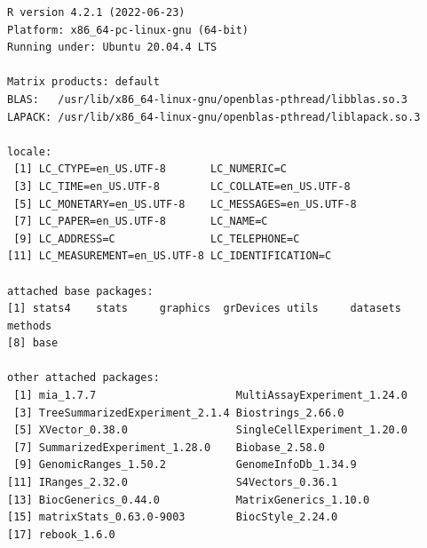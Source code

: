 \documentclass[
]{book}
\begin{document}
\begin{verbatim}
R version 4.2.1 (2022-06-23)
Platform: x86_64-pc-linux-gnu (64-bit)
Running under: Ubuntu 20.04.4 LTS

Matrix products: default
BLAS:   /usr/lib/x86_64-linux-gnu/openblas-pthread/libblas.so.3
LAPACK: /usr/lib/x86_64-linux-gnu/openblas-pthread/liblapack.so.3

locale:
 [1] LC_CTYPE=en_US.UTF-8       LC_NUMERIC=C              
 [3] LC_TIME=en_US.UTF-8        LC_COLLATE=en_US.UTF-8    
 [5] LC_MONETARY=en_US.UTF-8    LC_MESSAGES=en_US.UTF-8   
 [7] LC_PAPER=en_US.UTF-8       LC_NAME=C                 
 [9] LC_ADDRESS=C               LC_TELEPHONE=C            
[11] LC_MEASUREMENT=en_US.UTF-8 LC_IDENTIFICATION=C       

attached base packages:
[1] stats4    stats     graphics  grDevices utils     datasets  methods  
[8] base     

other attached packages:
 [1] mia_1.7.7                      MultiAssayExperiment_1.24.0   
 [3] TreeSummarizedExperiment_2.1.4 Biostrings_2.66.0             
 [5] XVector_0.38.0                 SingleCellExperiment_1.20.0   
 [7] SummarizedExperiment_1.28.0    Biobase_2.58.0                
 [9] GenomicRanges_1.50.2           GenomeInfoDb_1.34.9           
[11] IRanges_2.32.0                 S4Vectors_0.36.1              
[13] BiocGenerics_0.44.0            MatrixGenerics_1.10.0         
[15] matrixStats_0.63.0-9003        BiocStyle_2.24.0              
[17] rebook_1.6.0                  


\end{verbatim}
\end{document}
